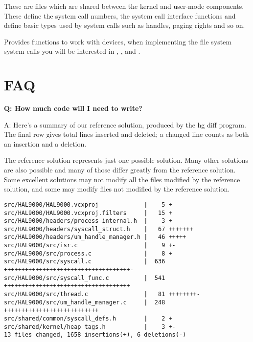 


These are files which are shared between the kernel and user-mode components. These define the
system call numbers, the system call interface functions and define basic types used by system
calls such as handles, paging rights and so on.


Provides functions to work with devices, when implementing the file system system calls you will be
interested in , ,  and .

\section{FAQ}

\textbf{Q: How much code will I need to write?}

A: Here’s a summary of our reference solution, produced by the hg  diff program. The final row gives
total lines inserted and deleted; a changed line counts as both an insertion and a deletion.

The reference solution represents just one possible solution. Many other solutions are also possible
and many of those differ greatly from the reference solution. Some excellent solutions may not
modify all the files modified by the reference solution, and some may modify files not modified by
the reference solution.

\begin{verbatim}
src/HAL9000/HAL9000.vcxproj             |    5 +
src/HAL9000/HAL9000.vcxproj.filters     |   15 +
src/HAL9000/headers/process_internal.h  |    3 +
src/HAL9000/headers/syscall_struct.h    |   67 +++++++
src/HAL9000/headers/um_handle_manager.h |   46 +++++
src/HAL9000/src/isr.c                   |    9 +-
src/HAL9000/src/process.c               |    8 +
src/HAL9000/src/syscall.c               |  636 ++++++++++++++++++++++++++++++++++++-
src/HAL9000/src/syscall_func.c          |  541 ++++++++++++++++++++++++++++++++++++
src/HAL9000/src/thread.c                |   81 ++++++++-
src/HAL9000/src/um_handle_manager.c     |  248 +++++++++++++++++++++++++++
src/shared/common/syscall_defs.h        |    2 +
src/shared/kernel/heap_tags.h           |    3 +-
13 files changed, 1658 insertions(+), 6 deletions(-)
\end{verbatim}

